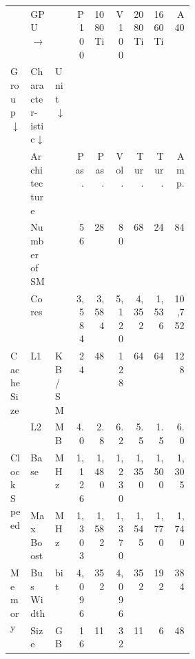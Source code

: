 \begin{tabular}{p{0.11\linewidth}p{0.12\linewidth}p{0.08\linewidth}rrrrrr}
    \toprule
                                                  & GPU $\rightarrow$                    &                  & P100  & 1080Ti & V100   & 2080Ti & 1660Ti & A40    \\
    Group$\downarrow$                             & Character-\newline istic$\downarrow$ & Unit$\downarrow$ &       &        &        &        &        &        \\
    \midrule\midrule
    \multirow[t]{3}{\linewidth}{}                 & Architecture                         &                  & Pas.  & Pas.   & Vol.   & Tur.   & Tur.   & Amp.   \\
    \cline{2-9}
                                                  & Number of SM                         &                  & 56    & 28     & 80     & 68     & 24     & 84     \\
    \cline{2-9}
                                                  & Cores                                &                  & 3,584 & 3,584  & 5,120  & 4,352  & 1,536  & 10,752 \\
    \cline{1-9} \cline{2-9}
    \multirow[t]{2}{\linewidth}{Cache Size}       & L1                                   & KB/SM            & 24    & 48     & 128    & 64     & 64     & 128    \\
    \cline{2-9}
                                                  & L2                                   & MB               & 4.0   & 2.8    & 6.2    & 5.5    & 1.5    & 6.0    \\
    \cline{1-9} \cline{2-9}
    \multirow[t]{2}{\linewidth}{Clock Speed}      & Base                                 & MHz              & 1,126 & 1,480  & 1,230  & 1,350  & 1,500  & 1,305  \\
    \cline{2-9}
                                                  & Max Boost                            & MHz              & 1,303 & 1,582  & 1,370  & 1,545  & 1,770  & 1,740  \\
    \cline{1-9} \cline{2-9}
    \multirow[t]{4}{\linewidth}{Memory}           & Bus Width                            & bit              & 4,096 & 352    & 4,096  & 352    & 192    & 384    \\
    \cline{2-9}
                                                  & Size                                 & GB               & 16    & 11     & 32     & 11     & 6      & 48     \\

\end{tabular}
